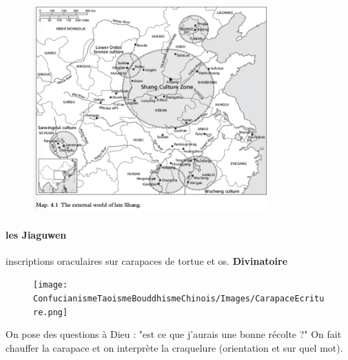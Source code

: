 \begin{figure}[!h]
    \centering
\includegraphics[width=0.8\textwidth]{ConfucianismeTaoismeBouddhismeChinois/Images/EmpireShang.png}

    \label{fig:enter-label}
\end{figure}

 \FloatBarrier
\paragraph{les Jiaguwen}
\begin{Def}[Jiaguwen]
    inscriptions oraculaires sur carapaces de tortue et os.
    \textbf{Divinatoire}
\end{Def}


\begin{figure}[!h]
    \centering
\texttt{[image: ConfucianismeTaoismeBouddhismeChinois/Images/CarapaceEcriture.png]}

    \label{fig:enter-label}
\end{figure}
\begin{Ex}
    On pose des questions à Dieu : "est ce que j'aurais une bonne récolte ?"
On fait chauffer la carapace et on interprète la craquelure (orientation et sur quel mot). 
\end{Ex}

